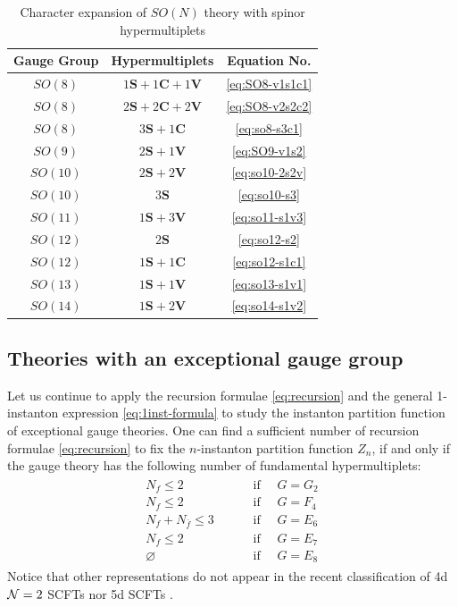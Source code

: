 \documentclass[letterpaper, 11pt]{article}
\def\CN{{\cal N}}
\begin{document}
{\begin{table}[h!]
  \centering
  \begin{tabular}{cc|c}
    \hline
    Gauge Group & Hypermultiplets & Equation No.\\
    \hline\hline
	$SO(8)$ & $1\boldsymbol{S}+1\boldsymbol{C}+1\boldsymbol{V}$ & \eqref{eq:SO8-v1s1c1}\\
	$SO(8)$ & $2\boldsymbol{S}+2\boldsymbol{C}+2\boldsymbol{V}$ & \eqref{eq:SO8-v2s2c2}\\
	$SO(8)$ & $3\boldsymbol{S}+1\boldsymbol{C}$ &  \eqref{eq:so8-s3c1}\\
	$SO(9)$ & $2\boldsymbol{S}+1\boldsymbol{V}$ & \eqref{eq:SO9-v1s2}\\
	$SO(10)$ & $2\boldsymbol{S}+2\boldsymbol{V}$ & \eqref{eq:so10-2s2v}\\
	$SO(10)$ & $3\boldsymbol{S}$ & \eqref{eq:so10-s3}\\
	$SO(11)$ & $1\boldsymbol{S}+3\boldsymbol{V}$ & \eqref{eq:so11-s1v3}\\
	$SO(12)$ & $2\boldsymbol{S}$ & \eqref{eq:so12-s2}\\
	$SO(12)$ & $1\boldsymbol{S}+1\boldsymbol{C}$ & \eqref{eq:so12-s1c1}\\
	$SO(13)$ & $1\boldsymbol{S}+1\boldsymbol{V}$ & \eqref{eq:so13-s1v1}\\
	$SO(14)$ & $1\boldsymbol{S}+2\boldsymbol{V}$ & \eqref{eq:so14-s1v2}\\\hline
    \end{tabular}
  \caption{Character expansion of $SO(N)$ theory with spinor hypermultiplets}
  \label{tbl:son-data}
\end{table}


\subsection{Theories with an exceptional gauge group}
\label{subsec:exceptional}


Let us continue to apply the recursion formulae \eqref{eq:recursion} and the general 1-instanton expression \eqref{eq:1inst-formula} to study the instanton partition function of exceptional gauge theories. One can find a sufficient number of recursion formulae \eqref{eq:recursion} to fix the $n$-instanton partition function $Z_n$, if and only if the gauge theory has the following number of fundamental hypermultiplets: 
\begin{align}
  \label{eq:exceptional-range}
  \begin{split}
    N_{f} \leq 2 & \qquad\text{ if }\quad G=G_2\\
    N_{f} \leq 2 & \qquad\text{ if }\quad G=F_4\\
    N_{f}+N_{\overline{f}} \leq 3 & \qquad\text{ if }\quad G=E_6\\
    N_{f} \leq 2 & \qquad\text{ if }\quad G=E_7\\
    \varnothing & \qquad\text{ if }\quad G=E_8
  \end{split}
\end{align}
Notice that other representations do not appear in the recent classification of 4d $\CN=2$ SCFTs \cite{Bhardwaj:2013qia} nor 5d SCFTs \cite{Jefferson:2017ahm}.

}
\end{document}
